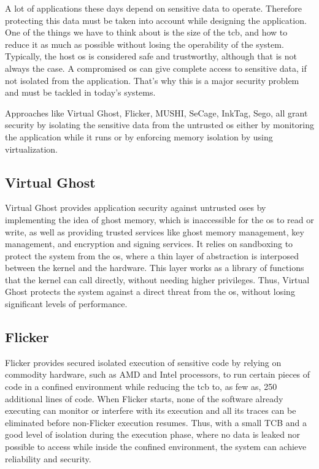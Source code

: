 A lot of applications these days depend on sensitive data to operate. Therefore protecting this data must be taken into account while designing the application. 
One of the things we have to think about is the size of the \gls{tcb}, and how to reduce it as much as possible without losing the operability of the system. 
Typically, the host \gls{os} is considered safe and trustworthy, although that is not always the case. A compromised \gls{os} can give complete access to sensitive data, if not isolated from the application. That’s why this is a major security problem and must be tackled in today’s systems.

Approaches like Virtual Ghost, Flicker, MUSHI, SeCage, InkTag, Sego, all grant security by isolating the sensitive data from the untrusted \gls{os} either by monitoring the application while it runs or by enforcing memory isolation by using virtualization.\newline

\subsection{Virtual Ghost} 

Virtual Ghost \cite{virtGhostPaper} provides application security against untrusted \gls{os}es by implementing the idea of ghost memory, which is inaccessible for the \gls{os} to read or write, as well as providing trusted services like ghost memory management, key management, and encryption and signing services. 
It relies on sandboxing to protect the system from the \gls{os}, where a thin layer of abstraction is interposed between the kernel and the hardware. This layer works as a library of functions that the kernel can call directly, without needing higher privileges. 
Thus, Virtual Ghost protects the system against a direct threat from the \gls{os}, without losing significant levels of performance.\newline


\subsection{Flicker} 

Flicker \cite{flickerPaper} provides secured isolated execution of sensitive code by relying on commodity hardware, such as AMD and Intel processors, to run certain pieces of code in a confined environment while reducing the \gls{tcb} to, as few as, 250 additional lines of code. 
When Flicker starts, none of the software already executing can monitor or interfere with its execution and all its traces can be eliminated before non-Flicker execution resumes. 
Thus, with a small TCB and a good level of isolation during the execution phase, where no data is leaked nor possible to access while inside the confined environment, the system can achieve reliability and security.\newline

